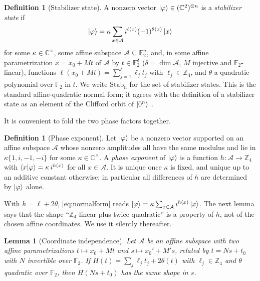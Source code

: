 \documentclass[11pt]{article}
\theoremstyle{plain}
\newtheorem{lemma}[theorem]{Lemma}
\theoremstyle{definition}
\newtheorem{definition}[theorem]{Definition}
\newcommand{\F}{\mathbb{F}}
\newcommand{\Z}{\mathbb{Z}}
\newcommand{\C}{\mathbb{C}}
\newcommand{\Stab}{\mathrm{Stab}}
\begin{document}
\begin{definition}[Stabilizer state]\label{def:stab}
A nonzero vector $\ket\varphi\in(\C^2)^{\otimes n}$ is a \emph{stabilizer state} if
\begin{equation}\label{eq:normalform}
\ket\varphi=\kappa\sum_{x\in\mathcal A}i^{\ell(x)}(-1)^{\theta(x)}\ket x
\end{equation}
for some $\kappa\in\C^\times$, some affine subspace $\mathcal A\subseteq\F_2^n$, and,
in some affine parametrization $x=x_0+Mt$ of $\mathcal A$ by $t\in\F_2^{\delta}$
($\delta=\dim\mathcal A$, $M$ injective and $\F_2$-linear), functions
$\ell(x_0+Mt)=\sum_{j=1}^{\delta}\ell_jt_j$ with $\ell_j\in\Z_4$, and $\theta$ a quadratic
polynomial over $\F_2$ in $t$. We write $\Stab_n$ for the set of stabilizer states.
This is the standard affine-quadratic normal form; it agrees with the definition of a
stabilizer state as an element of the Clifford orbit of $\ket{0^n}$
\cite{DehaeneDeMoor2003,VandenNest2010}.
\end{definition}

It is convenient to fold the two phase factors together.

\begin{definition}[Phase exponent]\label{def:exponent}
Let $\ket\varphi$ be a nonzero vector supported on an affine subspace $\mathcal A$
whose nonzero amplitudes all have the same modulus and lie in
$\kappa\{1,i,-1,-i\}$ for some $\kappa\in\C^\times$. A \emph{phase exponent} of
$\ket\varphi$ is a function $h:\mathcal A\to\Z_4$ with
$\braket{x|\varphi}=\kappa\, i^{h(x)}$ for all $x\in\mathcal A$. It is unique once
$\kappa$ is fixed, and unique up to an additive constant otherwise; in particular all
differences of $h$ are determined by $\ket\varphi$ alone.
\end{definition}

With $h=\ell+2\theta$, \eqref{eq:normalform} reads
$\ket\varphi=\kappa\sum_{x\in\mathcal A}i^{h(x)}\ket x$. The next lemma says that the
shape ``$\Z_4$-linear plus twice quadratic'' is a property of $h$, not of the chosen
affine coordinates. We use it silently thereafter.

\begin{lemma}[Coordinate independence]\label{lem:coordfree}
Let $\mathcal A$ be an affine subspace with two affine parametrizations
$t\mapsto x_0+Mt$ and $s\mapsto x_0'+M's$, related by $t=Ns+t_0$ with $N$ invertible
over $\F_2$. If $H(t)=\sum_j\ell_jt_j+2\theta(t)$ with $\ell_j\in\Z_4$ and $\theta$
quadratic over $\F_2$, then $H(Ns+t_0)$ has the same shape in $s$.
\end{lemma}
\end{document}
